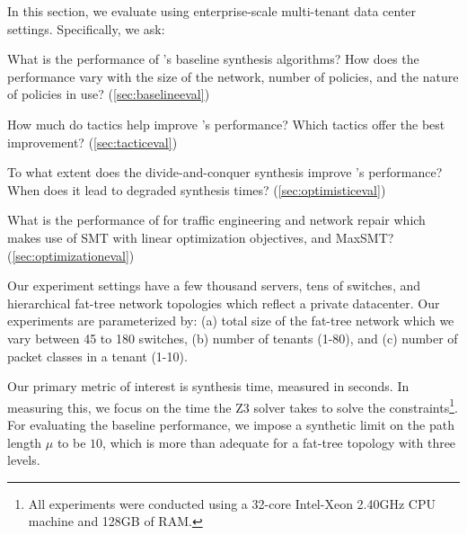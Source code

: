 In this section, we evaluate \Name using
enterprise-scale multi-tenant data
center settings. 
Specifically, we ask:
\begin{compactitemize}

\item What is the performance of \Name's baseline synthesis
  algorithms? How does the performance vary with the size of the
  network, number of policies, and the nature of policies in use? (\cref{sec:baselineeval})

\item How much do tactics help improve \Name's 
  performance? Which tactics offer the best improvement? (\cref{sec:tacticeval})

\item To what extent does the divide-and-conquer synthesis improve \Name's
  performance? When does it lead to degraded synthesis times? (\cref{sec:optimisticeval})

\item What is the performance of \name for traffic engineering and network repair
which makes use of SMT with linear optimization objectives, and MaxSMT? (\cref{sec:optimizationeval})

\end{compactitemize}
Our experiment settings have a few thousand servers, tens of switches,
and hierarchical fat-tree network topologies which reflect a private
datacenter. Our experiments are parameterized by: (a) total size of
the fat-tree network which we vary between 45 to 180 switches, (b) number of
tenants (1-80), and (c) number of packet classes in a tenant (1-10).

Our primary metric of interest is synthesis time, measured in
seconds. In measuring this, we focus on the time the Z3 solver takes
to solve the constraints\footnote{All experiments were conducted using a
	32-core Intel-Xeon 2.40GHz CPU machine and
	128GB of RAM.}. For evaluating the baseline performance, we impose a
synthetic limit on the path length $\mu$ to be $10$, which is more than adequate 
for a fat-tree topology with three levels. 

